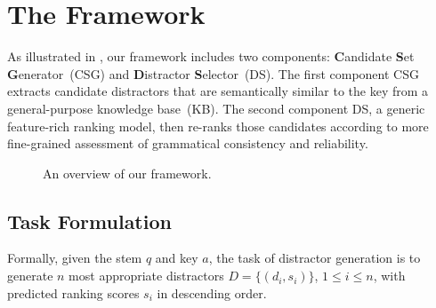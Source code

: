 \section{The Framework}
\label{sec:method}
As illustrated in , our framework includes two 
components: \textbf{C}andidate \textbf{S}et \textbf{G}enerator~(CSG) and \textbf{D}istractor \textbf{S}elector~(DS). The first component CSG extracts candidate distractors that are semantically similar to the key from a general-purpose knowledge base~(KB). The second component DS, a generic feature-rich ranking model, then re-ranks those candidates according to more fine-grained assessment of grammatical consistency and reliability.
\begin{figure}[t!]
\centering
{}
\caption{An overview of our framework.} \label{fig:framework}
\end{figure}

\subsection{Task Formulation}
Formally, given the stem $q$ and key $a$, the task of distractor generation is to generate $n$ most 
appropriate distractors $D = \{(d_i, s_i)\}$, $1\leq i\leq n$,
with predicted ranking scores $s_i$ in descending order. 

